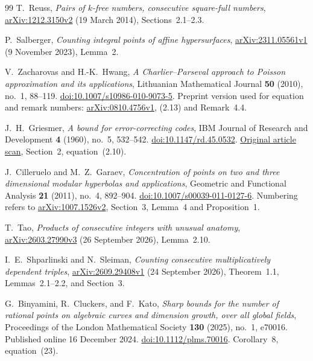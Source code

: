 \begin{thebibliography}{99}
T.~Reuss,
\emph{Pairs of \(k\)-free numbers, consecutive square-full
numbers},
\href{https://arxiv.org/abs/1212.3150v2}
{arXiv:1212.3150v2} (19 March 2014), Sections~2.1--2.3.

P.~Salberger,
\emph{Counting integral points of affine hypersurfaces},
\href{https://arxiv.org/abs/2311.05561v1}
{arXiv:2311.05561v1} (9 November 2023), Lemma~2.

V.~Zacharovas and H.-K.~Hwang,
\emph{A Charlier--Parseval approach to Poisson approximation
and its applications},
Lithuanian Mathematical Journal \textbf{50} (2010), no.~1,
88--119.
\href{https://doi.org/10.1007/s10986-010-9073-5}
{doi:10.1007/s10986-010-9073-5}.
Preprint version used for equation and remark numbers:
\href{https://arxiv.org/abs/0810.4756v1}
{arXiv:0810.4756v1}, (2.13) and Remark~4.4.

J.~H.~Griesmer,
\emph{A bound for error-correcting codes},
IBM Journal of Research and Development \textbf{4} (1960),
no.~5, 532--542.
\href{https://doi.org/10.1147/rd.45.0532}
{doi:10.1147/rd.45.0532}.
\href{https://bitsavers.trailing-edge.com/pdf/ibm/IBM_Journal_of_Research_and_Development/045/ibmrd0405M.pdf}
{Original article scan}, Section~2, equation~(2.10).

J.~Cilleruelo and M.~Z.~Garaev,
\emph{Concentration of points on two and three dimensional
modular hyperbolas and applications},
Geometric and Functional Analysis \textbf{21} (2011),
no.~4, 892--904.
\href{https://doi.org/10.1007/s00039-011-0127-6}
{doi:10.1007/s00039-011-0127-6}.
Numbering refers to
\href{https://arxiv.org/abs/1007.1526v2}{arXiv:1007.1526v2},
Section~3, Lemma~4 and Proposition~1.

T.~Tao,
\emph{Products of consecutive integers with unusual anatomy},
\href{https://arxiv.org/abs/2603.27990v3}{arXiv:2603.27990v3}
(26 September 2026), Lemma~2.10.

I.~E.~Shparlinski and N.~Sleiman,
\emph{Counting consecutive multiplicatively dependent triples},
\href{https://arxiv.org/abs/2609.29408v1}
{arXiv:2609.29408v1} (24 September 2026),
Theorem~1.1, Lemmas~2.1--2.2, and Section~3.

G.~Binyamini, R.~Cluckers, and F.~Kato,
\emph{Sharp bounds for the number of rational points on algebraic curves
and dimension growth, over all global fields},
Proceedings of the London Mathematical Society \textbf{130} (2025),
no.~1, e70016. Published online 16 December 2024.
\href{https://doi.org/10.1112/plms.70016}
{doi:10.1112/plms.70016}.
Corollary~8, equation~(23).


\end{thebibliography}
